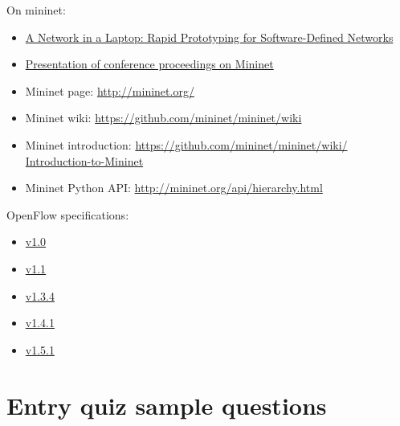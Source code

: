 \documentclass[a4paper]{article}
\begin{document}
On mininet:
\begin{itemize}
    \item \href{https://qosip.tmit.bme.hu/foswiki/pub/Meres/OpenFlowMScMeresiSegedlet/a19-lantz.pdf}{A Network in a
              Laptop: Rapid Prototyping for Software-Defined Networks}
    \item

          \href{https://qosip.tmit.bme.hu/foswiki/pub/Meres/OpenFlowMScMeresiSegedlet/mininet-hotnets2010-final.pdf}{Presentation
              of conference proceedings on Mininet}
    \item	Mininet page: \url{http://mininet.org/}
    \item	Mininet wiki: \url{https://github.com/mininet/mininet/wiki}
    \item	Mininet introduction: \url{https://github.com/mininet/mininet/wiki/  Introduction-to-Mininet}
    \item	Mininet Python API: \url{http://mininet.org/api/hierarchy.html}
\end{itemize}

OpenFlow specifications:
\begin{itemize}
    \item
          \href{https://qosip.tmit.bme.hu/foswiki/pub/Meres/OpenFlowMScMeresiSegedlet/openflow-spec-v1.0.0.pdf}{v1.0}
    \item
          \href{https://qosip.tmit.bme.hu/foswiki/pub/Meres/OpenFlowMScMeresiSegedlet/openflow-spec-v1.1.0.pdf}{v1.1}
    \item

          \href{https://qosip.tmit.bme.hu/foswiki/pub/Meres/OpenFlowMScMeresiSegedlet/openflow-switch-v1.3.4.pdf}{v1.3.4}
    \item

          \href{https://qosip.tmit.bme.hu/foswiki/pub/Meres/OpenFlowMScMeresiSegedlet/openflow-switch-v1.4.1.pdf}{v1.4.1}
    \item

          \href{https://qosip.tmit.bme.hu/foswiki/pub/Meres/OpenFlowMScMeresiSegedlet/openflow-switch-v1.5.1.pdf}{v1.5.1}

\end{itemize}

\appendix

\section{Entry quiz sample questions}
\end{document}
